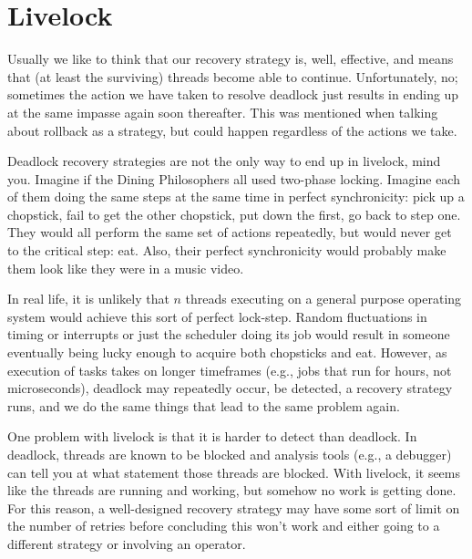 \section*{Livelock}

Usually we like to think that our recovery strategy is, well, effective, and means that (at least the surviving) threads become able to continue. Unfortunately, no; sometimes the action we have taken to resolve deadlock just results in ending up at the same impasse again soon thereafter. This was mentioned when talking about rollback as a strategy, but could happen regardless of the actions we take.

Deadlock recovery strategies are not the only way to end up in livelock, mind you. Imagine if the Dining Philosophers all used two-phase locking. Imagine each of them doing the same steps at the same time in perfect synchronicity: pick up a chopstick, fail to get the other chopstick, put down the first, go back to step one. They would all perform the same set of actions repeatedly, but would never get to the critical step: eat. Also, their perfect synchronicity would probably make them look like they were in a music video.

In real life, it is unlikely that $n$ threads executing on a general purpose operating system would achieve this sort of perfect lock-step. Random fluctuations in timing or interrupts or just the scheduler doing its job would result in someone eventually being lucky enough to acquire both chopsticks and eat. However, as execution of tasks takes on longer timeframes (e.g., jobs that run for hours, not microseconds), deadlock may repeatedly occur, be detected, a recovery strategy runs, and we do the same things that lead to the same problem again. 

One problem with livelock is that it is harder to detect than deadlock. In deadlock, threads are known to be blocked and analysis tools (e.g., a debugger) can tell you at what statement those threads are blocked. With livelock, it seems like the threads are running and working, but somehow no work is getting done. For this reason, a well-designed recovery strategy may have some sort of limit on the number of retries before concluding this won't work and either going to a different strategy or involving an operator.





